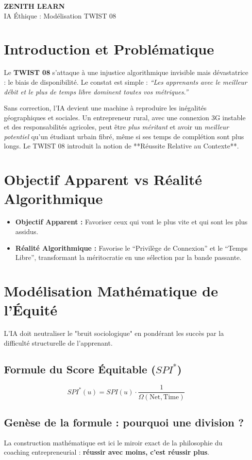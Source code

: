\documentclass[11pt,a4paper]{article}
\newcommand{\makebrandtitle}{
    \begin{tcolorbox}[enhanced, colback=BrandDark, colframe=BrandPrimary, arc=10pt, boxrule=2pt, halign=center]
        \vspace{0.3cm}
        {\Huge \bfseries \color{white} ZENITH LEARN} \\
        \vspace{0.2cm}
        {\Large \color{BrandPrimary} IA Éthique : Modélisation TWIST 08} \\
        \vspace{0.3cm}
    \end{tcolorbox}
    \vspace{0.5cm}
}
\begin{document}
\makebrandtitle

\section{Introduction et Problématique}
Le \textbf{TWIST 08} s'attaque à une injustice algorithmique invisible mais dévastatrice : le biais de disponibilité. Le constat est simple : \textit{``Les apprenants avec le meilleur débit et le plus de temps libre dominent toutes vos métriques.''} 

Sans correction, l'IA devient une machine à reproduire les inégalités géographiques et sociales. Un entrepreneur rural, avec une connexion 3G instable et des responsabilités agricoles, peut être \textit{plus méritant} et avoir un \textit{meilleur potentiel} qu'un étudiant urbain fibré, même si ses temps de complétion sont plus longs. Le TWIST 08 introduit la notion de **Réussite Relative au Contexte**.

\section{Objectif Apparent vs Réalité Algorithmique}
\begin{itemize}
    \item \textbf{Objectif Apparent :} Favoriser ceux qui vont le plus vite et qui sont les plus assidus.
    \item \textbf{Réalité Algorithmique :} Favorise le ``Privilège de Connexion'' et le ``Temps Libre'', transformant la méritocratie en une sélection par la bande passante.
\end{itemize}

\section{Modélisation Mathématique de l'Équité}
L'IA doit neutraliser le "bruit sociologique" en pondérant les succès par la difficulté structurelle de l'apprenant.

\subsection{Formule du Score Équitable ($SPI^*$)}
\begin{equation}
SPI^*(u) = SPI(u) \cdot \frac{1}{\Omega(\text{Net}, \text{Time})}
\end{equation}

\subsection{Genèse de la formule : pourquoi une division ?}
La construction mathématique est ici le miroir exact de la philosophie du coaching entrepreneurial : \textbf{réussir avec moins, c'est réussir plus}. 
\end{document}
